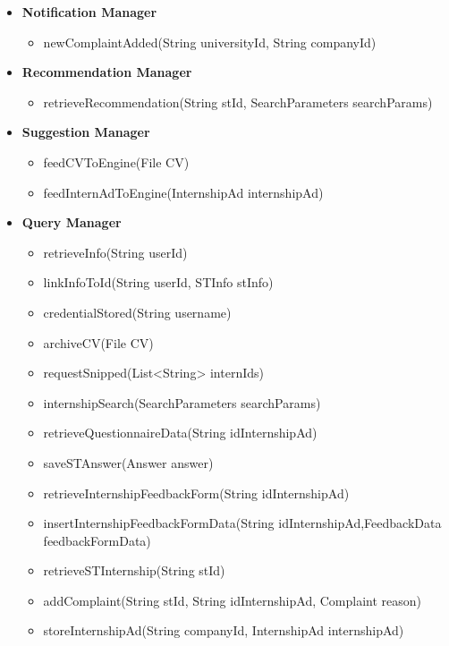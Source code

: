 \begin{itemize}
      \item \textbf{Notification Manager}
          \begin{itemize}
              \item newComplaintAdded(String universityId, String companyId)
          \end{itemize}
  
      \item \textbf{Recommendation Manager}
          \begin{itemize}
              \item retrieveRecommendation(String stId, SearchParameters searchParams)
          \end{itemize}
  
      \item \textbf{Suggestion Manager}
          \begin{itemize}
              \item feedCVToEngine(File CV)
              \item feedInternAdToEngine(InternshipAd internshipAd)
          \end{itemize}
  
      \item \textbf{Query Manager}
          \begin{itemize}
              \item retrieveInfo(String userId)
              \item linkInfoToId(String userId, STInfo stInfo)
              \item credentialStored(String username)
              \item archiveCV(File CV)
              \item requestSnipped(List<String> internIds)
              \item internshipSearch(SearchParameters searchParams)
              \item retrieveQuestionnaireData(String idInternshipAd)
              \item saveSTAnswer(Answer answer)
              \item retrieveInternshipFeedbackForm(String idInternshipAd)
              \item insertInternshipFeedbackFormData(String idInternshipAd,FeedbackData feedbackFormData)
              \item retrieveSTInternship(String stId)
              \item addComplaint(String stId, String idInternshipAd, Complaint reason)
              \item storeInternshipAd(String companyId, InternshipAd internshipAd)
          \end{itemize}
  

\end{itemize}
